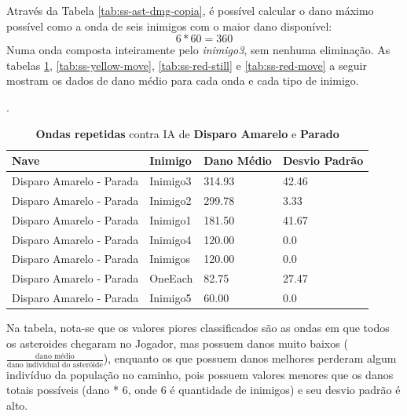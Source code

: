 \pagebreak

Através da Tabela \ref{tab:ss-ast-dmg-copia}, é possível calcular o dano máximo possível como a onda de seis inimigos com o maior dano disponível:
\[6 * 60 = 360\]
Numa onda composta inteiramente pelo \textit{inimigo3}, sem nenhuma eliminação. As tabelas \ref{tab:ss-yellow-still}, \ref{tab:ss-yellow-move}, \ref{tab:ss-red-still} e \ref{tab:ss-red-move} a seguir mostram os dados de dano médio para cada onda e cada tipo de inimigo.

\begin{table}
\centering
\caption{\textbf{Ondas repetidas} contra IA de \textbf{Disparo Amarelo} e \textbf{Parado}} .
\begin{tabular}{l|l|ll}
Nave                     & Inimigo  & Dano Médio & Desvio Padrão \\ \hline
Disparo Amarelo - Parada & Inimigo3 & 314.93     & 42.46         \\
Disparo Amarelo - Parada & Inimigo2 & 299.78     & 3.33          \\
Disparo Amarelo - Parada & Inimigo1 & 181.50     & 41.67         \\
Disparo Amarelo - Parada & Inimigo4 & 120.00     & 0.0           \\
Disparo Amarelo - Parada & Inimigos & 120.00     & 0.0           \\
Disparo Amarelo - Parada & OneEach  & 82.75      & 27.47         \\
Disparo Amarelo - Parada & Inimigo5 & 60.00      & 0.0          
\end{tabular}
\label{tab:ss-yellow-still}
\end{table}

Na tabela, nota-se que os valores piores classificados são as ondas em que todos os asteroides chegaram no Jogador, mas possuem danos muito baixos ($\frac{\text{dano médio}}{\text{dano individual do asteróide}}$), enquanto os que possuem danos melhores perderam algum indivíduo da população no caminho, pois possuem valores menores que os danos totais possíveis (dano * 6, onde 6 é quantidade de inimigos) e seu desvio padrão é alto.

